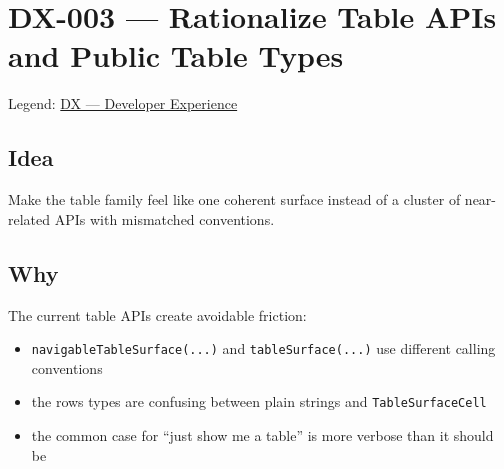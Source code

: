 \chapter{DX-003 --- Rationalize Table APIs and Public Table Types}\label{record-302}

\smallskip

Legend: \href{https://github.com/flyingrobots/bijou/blob/cbd70612140e7a450d764b3c7be1c6af878b99bc/docs/method/graveyard/legends/DX-developer-experience.md}{DX --- Developer Experience}

\section{Idea}\label{record-302-idea}

Make the table family feel like one coherent surface instead of a cluster of near-related APIs with mismatched conventions.

\section{Why}\label{record-302-why}

The current table APIs create avoidable friction:

\begin{itemize}
\tightlist
\item
  \texttt{n\allowbreak{}a\allowbreak{}v\allowbreak{}i\allowbreak{}g\allowbreak{}a\allowbreak{}b\allowbreak{}l\allowbreak{}e\allowbreak{}T\allowbreak{}a\allowbreak{}b\allowbreak{}l\allowbreak{}e\allowbreak{}S\allowbreak{}u\allowbreak{}r\allowbreak{}f\allowbreak{}a\allowbreak{}c\allowbreak{}e\allowbreak{}(\allowbreak{}.\allowbreak{}.\allowbreak{}.\allowbreak{})} and \texttt{t\allowbreak{}a\allowbreak{}b\allowbreak{}l\allowbreak{}e\allowbreak{}S\allowbreak{}u\allowbreak{}r\allowbreak{}f\allowbreak{}a\allowbreak{}c\allowbreak{}e\allowbreak{}(\allowbreak{}.\allowbreak{}.\allowbreak{}.\allowbreak{})} use different calling conventions
\item
  the rows types are confusing between plain strings and \texttt{T\allowbreak{}a\allowbreak{}b\allowbreak{}l\allowbreak{}e\allowbreak{}S\allowbreak{}u\allowbreak{}r\allowbreak{}f\allowbreak{}a\allowbreak{}c\allowbreak{}e\allowbreak{}C\allowbreak{}e\allowbreak{}l\allowbreak{}l}
\item
  the common case for ``just show me a table'' is more verbose than it should be
\end{itemize}

